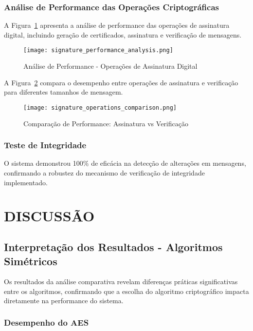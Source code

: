 \documentclass[12pt,a4paper,oneside]{article}
\begin{document}
\subsubsection{Análise de Performance das Operações Criptográficas}

A Figura~\ref{fig:signature_performance} apresenta a análise de performance das operações de assinatura digital, incluindo geração de certificados, assinatura e verificação de mensagens.

\begin{figure}[H]
\centering
\texttt{[image: signature\_performance\_analysis.png]}
\caption{Análise de Performance - Operações de Assinatura Digital}
\label{fig:signature_performance}
\end{figure}

A Figura~\ref{fig:signature_comparison} compara o desempenho entre operações de assinatura e verificação para diferentes tamanhos de mensagem.

\begin{figure}[H]
\centering
\texttt{[image: signature\_operations\_comparison.png]}
\caption{Comparação de Performance: Assinatura vs Verificação}
\label{fig:signature_comparison}
\end{figure}

\subsubsection{Teste de Integridade}

O sistema demonstrou 100\% de eficácia na detecção de alterações em mensagens, confirmando a robustez do mecanismo de verificação de integridade implementado.

\section{DISCUSSÃO}

\subsection{Interpretação dos Resultados - Algoritmos Simétricos}

Os resultados da análise comparativa revelam diferenças práticas significativas entre os algoritmos, confirmando que a escolha do algoritmo criptográfico impacta diretamente na performance do sistema.

\subsubsection{Desempenho do AES}
\end{document}
